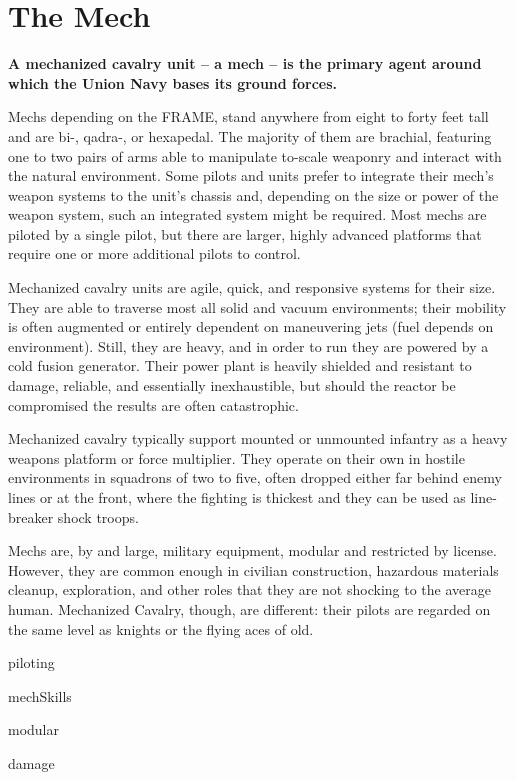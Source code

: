 \chapter{The Mech}

\textbf{A mechanized cavalry unit -- a mech -- is the primary agent around which the Union Navy bases its ground forces.}

Mechs depending on the FRAME, stand anywhere from eight to forty feet tall and are bi-, qadra-, or hexapedal. The majority of them are brachial, featuring one to two pairs of arms able to manipulate to-scale weaponry and interact with the natural environment. Some pilots and units prefer to integrate their mech’s weapon systems to the unit’s chassis and, depending on the size or power of the weapon system, such an integrated system might be required. Most mechs are piloted by a single pilot, but there are larger, highly advanced platforms that require one or more additional pilots to control. 

Mechanized cavalry units are agile, quick, and responsive systems for their size. They are able to traverse most all solid and vacuum environments; their mobility is often augmented or entirely dependent on maneuvering jets (fuel depends on environment). Still, they are heavy, and in order to run they are powered by a cold fusion generator. Their power plant is heavily shielded and resistant to damage, reliable, and essentially inexhaustible, but should the reactor be compromised the results are often catastrophic. 

Mechanized cavalry typically support mounted or unmounted infantry as a heavy weapons platform or force multiplier. They operate on their own in hostile environments in squadrons of two to five, often dropped either far behind enemy lines or at the front, where the fighting is thickest and they can be used as line-breaker shock troops. 

Mechs are, by and large, military equipment, modular and restricted by license. However, they are common enough in civilian construction, hazardous materials cleanup, exploration, and other roles that they are not shocking to the average human. Mechanized Cavalry, though, are different: their pilots are regarded on the same level as knights or the flying aces of old.

{piloting}

{mechSkills}

{modular}

{damage}
